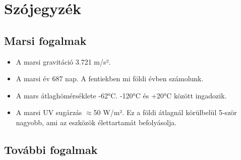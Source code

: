 \documentclass[12pt]{report}
\begin{document}
\chapter{Szójegyzék}
\section{Marsi fogalmak}
\begin{itemize}
  \item A marsi gravitáció 3.721 m/s².
  \item A marsi év 687 nap. A fentiekben mi földi évben számolunk.
  \item A mars átlaghömérséklete -62°C. -120°C és +20°C között ingadozik.
  \item A marsi UV sugárzás $\approx$50 W/m². Ez a földi átlagnál körülbelül 5-ször nagyobb, ami az eszközök élettartamát befolyásolja.
\end{itemize}


\section{További fogalmak}
\end{document}
